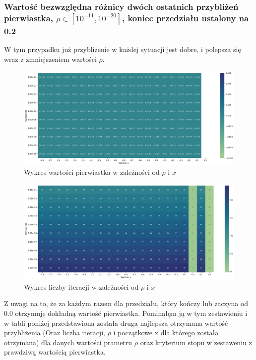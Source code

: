 \documentclass{article}
\begin{document}
\subsubsection{Wartość bezwzględna różnicy dwóch ostatnich przybliżeń pierwiastka, \(\rho \in [10^{-11}, 10^{-20}]\), koniec przedziału ustalony na 0.2}

W tym przypadku już przybliżenie w każdej sytuacji jest dobre, i polepsza się wraz z zmniejszeniem wartości \(\rho\).

\begin{figure}[H]
  \centering
  \begin{minipage}[b]{0.9\textwidth}
    \includegraphics[width=\textwidth]{heatmap23.png}
  \end{minipage}
  \caption{Wykres wartości pierwiastka w zależności od \(\rho\) i \(x\)}
\end{figure}

\begin{figure}[H]
  \centering
  \begin{minipage}[b]{0.9\textwidth}
    \includegraphics[width=\textwidth]{heatmap24.png}
  \end{minipage}
  \caption{Wykres liczby iteracji w zależności od \(\rho\) i \(x\)}
\end{figure}

\noindent
Z uwagi na to, że za każdym razem dla przedziału, który kończy lub zaczyna od 0.0 otrzymuję dokładną wartość pierwiastka. Pominąłęm ją w tym zestawieniu i w tabli poniżej przedstawiona została druga najlepsza otrzymana wartość przybliżenia (Oraz liczba iteracji, \(\rho\) i początkowe x dla którego została otrzymana) dla danych wartości prametru \(\rho\) oraz kryterium stopu w zestaweniu z prawdziwą wartością pierwiastka.
\end{document}
